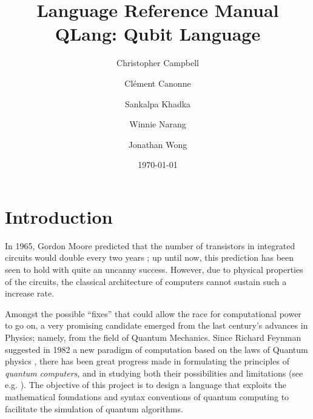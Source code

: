 \documentclass[11pt]{article}
\begin{document}
\title{Language Reference Manual \\ \vspace{2 mm} {\large QLang: Qubit Language}}
\author{
  Christopher Campbell
  \and Cl\'ement Canonne
  \and Sankalpa Khadka
  \and Winnie Narang
  \and Jonathan Wong
}
\date{\today}



\maketitle


\section{Introduction}

In 1965, Gordon Moore predicted that the number of transistors in integrated circuits would double every two years \cite{Moore:65}; up until now, this prediction has been seen to hold with quite an uncanny success. However, due to physical properties of the circuits, the classical architecture of computers cannot sustain such a increase rate.

Amongst the possible ``fixes'' that could allow the race for computational power to go on, a very promising candidate emerged from the last century's advances in Physics; namely, from the field of Quantum Mechanics. Since Richard Feynman suggested in 1982 a new paradigm of computation based on the laws of Quantum physics \cite{Feynman:82}, there has been great progress made in formulating the principles of \emph{quantum computers}, and in studying both their possibilities and limitations (see e.g. \cite{Shor:98,Williams:08,Nielsen:11}). The objective of this project is to design a language that exploits the mathematical foundations and syntax conventions of quantum computing to facilitate the simulation of quantum algorithms.
\end{document}
